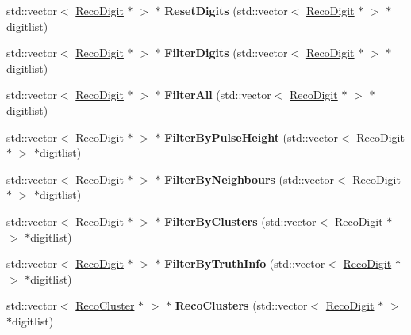 \begin{DoxyCompactItemize}
\item 
\hypertarget{classHitCleaner_a3c85370ccb39e1615976fe4acb218fb5}{
std::vector$<$ \hyperlink{classRecoDigit}{RecoDigit} $\ast$ $>$ $\ast$ {\bfseries ResetDigits} (std::vector$<$ \hyperlink{classRecoDigit}{RecoDigit} $\ast$ $>$ $\ast$digitlist)}
\label{classHitCleaner_a3c85370ccb39e1615976fe4acb218fb5}

\item 
\hypertarget{classHitCleaner_a16028ae7a55a4cdcfdb116af893d2542}{
std::vector$<$ \hyperlink{classRecoDigit}{RecoDigit} $\ast$ $>$ $\ast$ {\bfseries FilterDigits} (std::vector$<$ \hyperlink{classRecoDigit}{RecoDigit} $\ast$ $>$ $\ast$digitlist)}
\label{classHitCleaner_a16028ae7a55a4cdcfdb116af893d2542}

\item 
\hypertarget{classHitCleaner_a7e6188a785adddfcaa3dbe63de387e95}{
std::vector$<$ \hyperlink{classRecoDigit}{RecoDigit} $\ast$ $>$ $\ast$ {\bfseries FilterAll} (std::vector$<$ \hyperlink{classRecoDigit}{RecoDigit} $\ast$ $>$ $\ast$digitlist)}
\label{classHitCleaner_a7e6188a785adddfcaa3dbe63de387e95}

\item 
\hypertarget{classHitCleaner_a537c7f9b371c0dc52df86046f8a90336}{
std::vector$<$ \hyperlink{classRecoDigit}{RecoDigit} $\ast$ $>$ $\ast$ {\bfseries FilterByPulseHeight} (std::vector$<$ \hyperlink{classRecoDigit}{RecoDigit} $\ast$ $>$ $\ast$digitlist)}
\label{classHitCleaner_a537c7f9b371c0dc52df86046f8a90336}

\item 
\hypertarget{classHitCleaner_ad574e2c8d1718971cbfce2a284731daa}{
std::vector$<$ \hyperlink{classRecoDigit}{RecoDigit} $\ast$ $>$ $\ast$ {\bfseries FilterByNeighbours} (std::vector$<$ \hyperlink{classRecoDigit}{RecoDigit} $\ast$ $>$ $\ast$digitlist)}
\label{classHitCleaner_ad574e2c8d1718971cbfce2a284731daa}

\item 
\hypertarget{classHitCleaner_a32e29edc8c7564e423186efacbea07c5}{
std::vector$<$ \hyperlink{classRecoDigit}{RecoDigit} $\ast$ $>$ $\ast$ {\bfseries FilterByClusters} (std::vector$<$ \hyperlink{classRecoDigit}{RecoDigit} $\ast$ $>$ $\ast$digitlist)}
\label{classHitCleaner_a32e29edc8c7564e423186efacbea07c5}

\item 
\hypertarget{classHitCleaner_ad2c117045b0a63c700b0f2a94f3fa0b2}{
std::vector$<$ \hyperlink{classRecoDigit}{RecoDigit} $\ast$ $>$ $\ast$ {\bfseries FilterByTruthInfo} (std::vector$<$ \hyperlink{classRecoDigit}{RecoDigit} $\ast$ $>$ $\ast$digitlist)}
\label{classHitCleaner_ad2c117045b0a63c700b0f2a94f3fa0b2}

\item 
\hypertarget{classHitCleaner_a0e516802fcbaad1e3e61978911991949}{
std::vector$<$ \hyperlink{classRecoCluster}{RecoCluster} $\ast$ $>$ $\ast$ {\bfseries RecoClusters} (std::vector$<$ \hyperlink{classRecoDigit}{RecoDigit} $\ast$ $>$ $\ast$digitlist)}
\label{classHitCleaner_a0e516802fcbaad1e3e61978911991949}

\end{DoxyCompactItemize}
